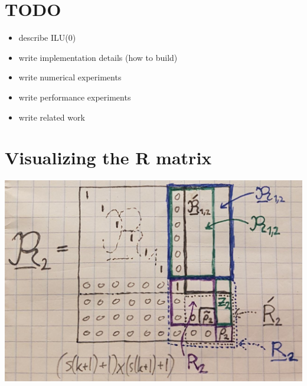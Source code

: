 \documentclass{scrartcl}
\numberwithin{equation}{section}
\begin{document}
\begin{appendices}
\begin{tabular}{l|r|r}
\end{tabular}

\section{TODO}
\begin{itemize}
\item describe ILU(0)
\item write implementation details (how to build)
\item write numerical experiments
\item write performance experiments
\item write related work
\end{itemize}

\section{Visualizing the R matrix}\label{app:R_2}
\begin{center}
	\includegraphics[scale=0.5]{visualize_R2.png}
\end{center}

\end{appendices}
\end{document}
